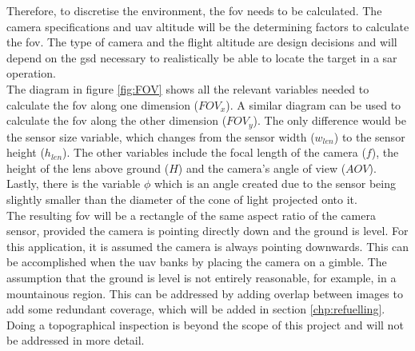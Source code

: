 Therefore, to discretise the environment, the \acl{fov} needs to be calculated. The camera specifications and \acs{uav} altitude will be the determining factors to calculate the \acs{fov}. The type of camera and the flight altitude are design decisions and will depend on the \acs{gsd} necessary to realistically be able to locate the target in a \acl{sar} operation.\\
The diagram in figure \ref{fig:FOV} shows all the relevant variables needed to calculate the \acl{fov} along one dimension ($FOV_x$). A similar diagram can be used to calculate the \acl{fov} along the other dimension ($FOV_y$). The only difference would be the sensor size variable, which changes from the sensor width ($w_{len}$) to the sensor height ($h_{len}$). The other variables include the focal length of the camera ($f$), the height of the lens above ground ($H$) and the camera's angle of view ($AOV$). Lastly, there is the variable $\phi$ which is an angle created due to the sensor being slightly smaller than the diameter of the cone of light projected onto it.\\
The resulting \acl{fov} will be a rectangle of the same aspect ratio of the camera sensor, provided the camera is pointing directly down and the ground is level. For this application, it is assumed the camera is always pointing downwards. This can be accomplished when the \acs{uav} banks by placing the camera on a gimble. The assumption that the ground is level is not entirely reasonable, for example, in a mountainous region. This can be addressed by adding overlap between images to add some redundant coverage, which will be added in section \ref{chp:refuelling}. Doing a topographical inspection is beyond the scope of this project and will not be addressed in more detail.\\
